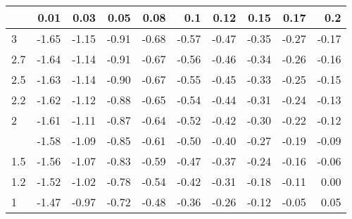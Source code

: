 
\begin{tabular}{lrrrrrrrrr}
\toprule
  & 0.01 & 0.03 & 0.05 & 0.08 & 0.1 & 0.12 & 0.15 & 0.17 & 0.2\\
\midrule
3 & -1.65 & -1.15 & -0.91 & -0.68 & -0.57 & -0.47 & -0.35 & -0.27 & -0.17\\
2.7 & -1.64 & -1.14 & -0.91 & -0.67 & -0.56 & -0.46 & -0.34 & -0.26 & -0.16\\
2.5 & -1.63 & -1.14 & -0.90 & -0.67 & -0.55 & -0.45 & -0.33 & -0.25 & -0.15\\
2.2 & -1.62 & -1.12 & -0.88 & -0.65 & -0.54 & -0.44 & -0.31 & -0.24 & -0.13\\
2 & -1.61 & -1.11 & -0.87 & -0.64 & -0.52 & -0.42 & -0.30 & -0.22 & -0.12\\
\addlinespace
1.7 & -1.58 & -1.09 & -0.85 & -0.61 & -0.50 & -0.40 & -0.27 & -0.19 & -0.09\\
1.5 & -1.56 & -1.07 & -0.83 & -0.59 & -0.47 & -0.37 & -0.24 & -0.16 & -0.06\\
1.2 & -1.52 & -1.02 & -0.78 & -0.54 & -0.42 & -0.31 & -0.18 & -0.11 & 0.00\\
1 & -1.47 & -0.97 & -0.72 & -0.48 & -0.36 & -0.26 & -0.12 & -0.05 & 0.05\\
\bottomrule
\end{tabular}
